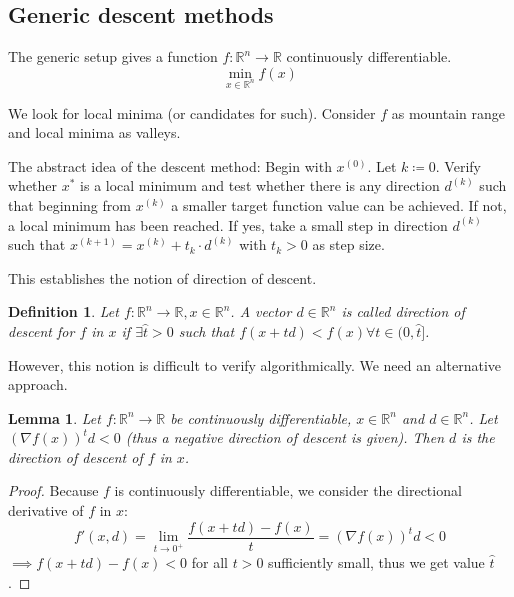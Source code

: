 \documentclass[a4paper]{article}
\newcounter{lecref}[subsection]
\numberwithin{lecref}{subsection}
\newtheorem{definition}[lecref]{Definition}
\newtheorem{lemma}[lecref]{Lemma}
\begin{document}
\subsection{Generic descent methods}

The generic setup gives a function $f: \mathbb R^n \to \mathbb R$ continuously differentiable.
\[ \min_{x \in \mathbb R^n} f(x) \]

We look for local minima (or candidates for such).
Consider $f$ as mountain range and local minima as valleys.

The abstract idea of the descent method:
Begin with $x^{(0)}$. Let $k \coloneqq 0$. Verify whether $x^*$ is a local minimum and test whether there is any direction $d^{(k)}$ such that beginning from $x^{(k)}$ a smaller target function value can be achieved. If not, a local minimum has been reached. If yes, take a small step in direction $d^{(k)}$ such that $x^{(k+1)} = x^{(k)} + t_k \cdot d^{(k)}$ with $t_k > 0$ as step size.

This establishes the notion of direction of descent.
\begin{definition}
	Let $f: \mathbb R^n \to \mathbb R, x \in \mathbb R^n$.
	A vector $d \in \mathbb R^n$ is called \emph{direction of descent} for $f$ in $x$ if $\exists \hat t > 0$ such that $f(x + td) < f(x) \forall t \in (0, \hat t]$.
\end{definition}

However, this notion is difficult to verify algorithmically. We need an alternative approach.

\begin{lemma}
	\label{lemma:5.3.1}
	Let $f: \mathbb R^n \to \mathbb R$ be continuously differentiable, $x \in \mathbb R^n$ and $d \in \mathbb R^n$.
	Let $(\nabla f(x))^t d < 0$ (thus a negative direction of descent is given).
	Then $d$ is the \emph{direction of descent} of $f$ in $x$.
\end{lemma}

\begin{proof}
	Because $f$ is continuously differentiable, we consider the directional derivative of $f$ in $x$:
	\[ f'(x, d) = \lim_{t \to 0^+} \frac{f(x + td) - f(x)}{t} = \left(\nabla f(x)\right)^t d < 0 \]
	$\implies f(x + td) - f(x) < 0$ for all $t > 0$ sufficiently small, thus we get value $\hat t$.
\end{proof}
\end{document}
